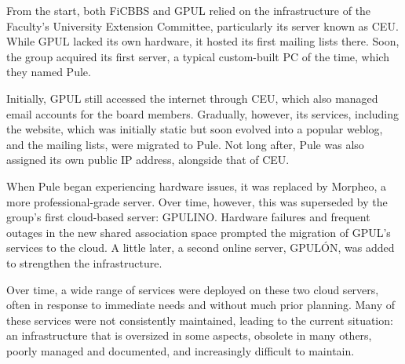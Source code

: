 From the start, both FiCBBS and GPUL relied on the infrastructure of
the Faculty’s University Extension Committee, particularly its server
known as CEU.  While GPUL lacked its own hardware, it hosted its first
mailing lists there.  Soon, the group acquired its first server, a
typical custom-built PC of the time, which they named Pule.

Initially, GPUL still accessed the internet through CEU, which also
managed email accounts for the board members. Gradually, however, its
services, including the website, which was initially static but soon
evolved into a popular weblog, and the mailing lists, were migrated to
Pule. Not long after, Pule was also assigned its own public IP
address, alongside that of CEU.

When Pule began experiencing hardware issues, it was replaced by
Morpheo, a more professional-grade server. Over time, however, this
was superseded by the group’s first cloud-based server:
GPULINO. Hardware failures and frequent outages in the new shared
association space prompted the migration of GPUL’s services to the
cloud. A little later, a second online server, GPULÓN, was added to
strengthen the infrastructure.

Over time, a wide range of services were deployed on these two cloud
servers, often in response to immediate needs and without much prior
planning. Many of these services were not consistently maintained,
leading to the current situation: an infrastructure that is oversized
in some aspects, obsolete in many others, poorly managed and
documented, and increasingly difficult to maintain.
